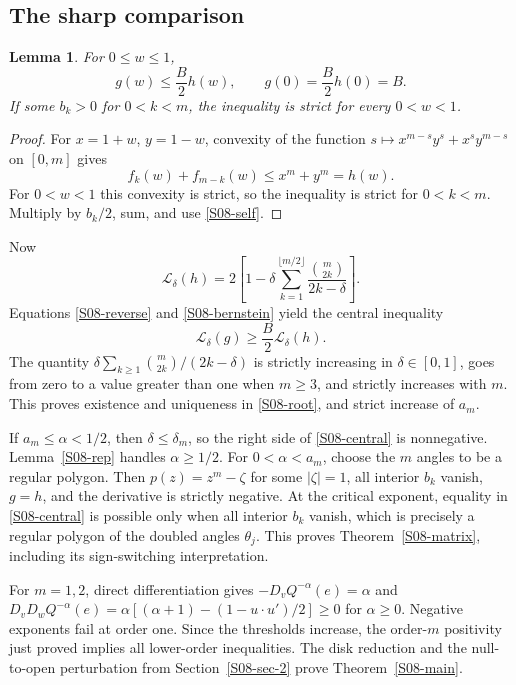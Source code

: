 \documentclass[11pt,a4paper]{article}
\newtheorem{lemma}[theorem]{Lemma}
\theoremstyle{definition}\newtheorem{definition}[theorem]{Definition}
\theoremstyle{remark}\newtheorem{remark}[theorem]{Remark}
\numberwithin{equation}{section}
\begin{document}
\subsection{The sharp comparison}\label{S08-sec-4}
\begin{lemma}\label{S08-comparison}
For $0\le w\le1$,
\begin{equation}\label{S08-bernstein}
 g(w)\le\frac B2h(w),\qquad g(0)=\frac B2h(0)=B.
\end{equation}
If some $b_k>0$ for $0<k<m$, the inequality is strict for every $0<w<1$.
\end{lemma}
\begin{proof}
For $x=1+w$, $y=1-w$, convexity of the function
$s\mapsto x^{m-s}y^s+x^sy^{m-s}$ on $[0,m]$ gives
\[
 f_k(w)+f_{m-k}(w)\le x^m+y^m=h(w).
\]
For $0<w<1$ this convexity is strict, so the inequality is strict for $0<k<m$. Multiply by $b_k/2$, sum, and use \eqref{S08-self}.
\end{proof}
Now
\[
 \mathcal L_\delta(h)
 =2\left[1-\delta\sum_{k=1}^{\lfloor m/2\rfloor}
 \frac{\binom m{2k}}{2k-\delta}\right].
\]
Equations \eqref{S08-reverse} and \eqref{S08-bernstein} yield the central inequality
\begin{equation}\label{S08-central}
 \mathcal L_\delta(g)\ge\frac B2\mathcal L_\delta(h).
\end{equation}
The quantity $\delta\sum_{k\ge1}\binom m{2k}/(2k-\delta)$ is strictly increasing in $\delta\in[0,1]$, goes from zero to a value greater than one when $m\ge3$, and strictly increases with $m$. This proves existence and uniqueness in \eqref{S08-root}, and strict increase of $a_m$.

If $a_m\le\alpha<1/2$, then $\delta\le\delta_m$, so the right side of \eqref{S08-central} is nonnegative. Lemma~\ref{S08-rep} handles $\alpha\ge1/2$. For $0<\alpha<a_m$, choose the $m$ angles to be a regular polygon. Then $p(z)=z^m-\zeta$ for some $|\zeta|=1$, all interior $b_k$ vanish, $g=h$, and the derivative is strictly negative. At the critical exponent, equality in \eqref{S08-central} is possible only when all interior $b_k$ vanish, which is precisely a regular polygon of the doubled angles $\theta_j$. This proves Theorem~\ref{S08-matrix}, including its sign-switching interpretation.

For $m=1,2$, direct differentiation gives $-D_vQ^{-\alpha}(e)=\alpha$ and
$D_vD_wQ^{-\alpha}(e)=\alpha[(\alpha+1)-(1-u\cdot u')/2]\ge0$ for $\alpha\ge0$. Negative exponents fail at order one. Since the thresholds increase, the order-$m$ positivity just proved implies all lower-order inequalities. The disk reduction and the null-to-open perturbation from Section~\ref{S08-sec-2} prove Theorem~\ref{S08-main}.
\end{document}
